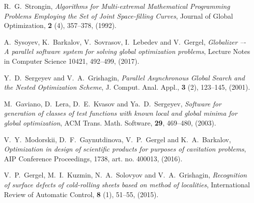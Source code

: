 \documentclass[
11pt,%
tightenlines,%
twoside,%
onecolumn,%
nofloats,%
nobibnotes,%
nofootinbib,%
superscriptaddress,%
noshowpacs,%
centertags]%
{revtex4}
\begin{document}
\begin{thebibliography}{20}
R.~G.~Strongin, \textit{Algorithms for Multi-extremal Mathematical Programming Problems Employing the Set of Joint Space-filling Curves}, Journal of Global Optimization, \textbf{2} (4), 357--378, (1992).

A.~Sysoyev, K.~Barkalov, V.~Sovrasov, I.~Lebedev and V.~Gergel, \textit{Globalizer –- A parallel software system for solving global optimization problems}, Lecture Notes in Computer Science 10421, 492--499, (2017). 

Y.~D.~Sergeyev and V.~A.~Grishagin, \textit{Parallel Asynchronous Global Search and the Nested Optimization Scheme}, J. Comput. Anal. Appl., \textbf{3} (2), 123--145, (2001).

M.~Gaviano, D.~Lera, D.~E.~Kvasov and Ya.~D.~Sergeyev, \textit{Software for generation of classes of test functions with known local and global minima for global optimization}, ACM Trans. Math. Software, \textbf{29}, 469--480, (2003).

V.~Y.~Modorskii, D.~F.~Gaynutdinova, V.~P.~Gergel and K.~A.~Barkalov, \textit{Optimization in design of scientific products for purposes of cavitation problems}, AIP Conference Proceedings, 1738, art. no. 400013, (2016).

V.~P.~Gergel, M.~I.~Kuzmin, N.~A.~Solovyov and V.~A.~Grishagin, \textit{Recognition of surface defects of cold-rolling sheets based on method of localities}, International Review of Automatic Control, \textbf{8} (1), 51--55, (2015).

\end{thebibliography}
\end{document}
